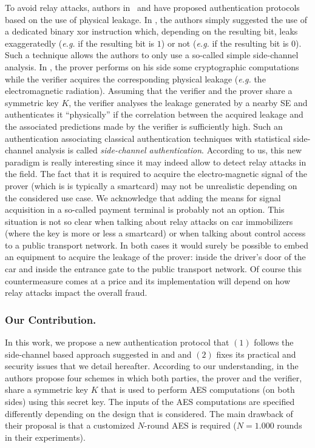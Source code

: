 \documentclass{llncs}
\newcommand\add[1]{#1}
\begin{document}
To avoid relay attacks, authors in~\cite{SakiyamaMMKHMMN15} and \cite{DBLP:conf/ccs/ReidNTS07} have proposed authentication protocols based on the use of physical leakage.
In \cite{DBLP:conf/ccs/ReidNTS07}, the authors simply suggested the use of a dedicated binary xor instruction which, depending on the resulting bit, leaks exaggeratedly (\emph{e.g.} if the resulting bit is $1$) or not (\emph{e.g.} if the resulting bit is $0$). Such a technique allows the authors to only use a so-called simple side-channel analysis.
In \cite{SakiyamaMMKHMMN15}, the prover performs on his side some cryptographic computations while the verifier acquires the corresponding physical leakage (\emph{e.g.} the electromagnetic radiation).
Assuming that the verifier and the prover share a symmetric key $K$, the verifier analyses the leakage generated by a nearby SE and authenticates it ``physically'' if the correlation between the acquired leakage and the associated predictions made by the verifier is sufficiently high. Such an authentication associating classical authentication techniques with statistical side-channel analysis is called \textit{side-channel authentication}.  
\add{According to us, this new paradigm is really interesting since it may indeed allow to detect relay attacks in the field. The fact that it is required to acquire the electro-magnetic signal of the prover (which is is typically a smartcard) may not be unrealistic depending on the considered use case. We acknowledge that adding the means for signal acquisition in a so-called  payment terminal is probably not an option. This situation is not so clear when talking about relay attacks on car immobilizers (where the key is more or less a smartcard) or when talking about control access to a public transport network. In both cases it would surely be possible to embed an equipment to acquire the leakage of the prover: inside the driver's door of the car and inside the entrance gate to the public transport network. Of course this countermeasure comes at a price and its implementation will depend on how relay attacks impact the overall fraud.}

\subsubsection{Our Contribution.}
In this work, we propose a new authentication protocol that $(1)$ follows the side-channel based approach suggested in \cite{SakiyamaMMKHMMN15} and \cite{DBLP:conf/ccs/ReidNTS07} and $(2)$ fixes its practical and security issues that we detail hereafter.
According to our understanding, in \cite{SakiyamaMMKHMMN15} the authors propose four schemes in which both parties, the prover and the verifier, share a symmetric key $K$ that is used to perform AES computations (on both sides) using this secret key. The inputs of the AES computations are specified differently depending on the design that is considered. The main drawback of their proposal is that a customized $N$-round AES is required ($N=1.000$ rounds in their experiments). 
\end{document}
